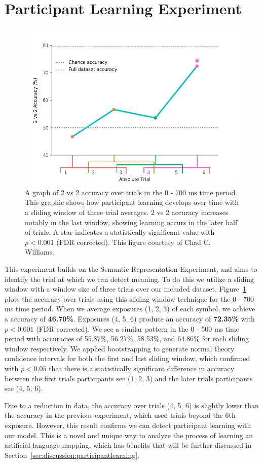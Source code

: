 \section{Participant Learning Experiment}
\label{sec:results:participantlearning}

\begin{figure}[!b]
  \centering
  \includegraphics[width=0.75\linewidth]{figures/learning}
  \caption[\tvt Accuracy over Trials]{
    A graph of 2 vs 2 accuracy over trials in the 0 - 700 ms time period. This 
    graphic shows how participant learning develops over time with a sliding 
    window of three trial averages.  2 vs 2 accuracy increases notably in the 
    last window, showing learning occurs in the later half of trials. A star 
    indicates a statistically significant value with $p < 0.001$ (FDR 
    corrected). This figure courtesy of Chad C. Williams.
  }
  \label{fig:learning}
\end{figure}

This experiment builds on the Semantic Representation Experiment, and aims to 
identify the trial at which we can detect meaning. To do this we utilize a 
sliding window with a window size of three trials over our included dataset.   
Figure~\ref{fig:learning} plots the \tvt accuracy over trials using this 
sliding window technique for the 0 - 700 ms time period. When we average 
exposures (1, 2, 3) of each symbol, we achieve a \tvt accuracy of 
\textbf{46.70\%}.  Exposures (4, 5, 6) produce an accuracy of \textbf{72.35\%} 
with $p < 0.001$ (FDR corrected). We see a similar pattern in the 0 - 500 ms 
time period with accuracies of 55.87\%, 56.27\%, 58.53\%, and 64.86\% for each 
sliding window respectively. We applied bootstrapping to generate normal theory 
confidence intervals for both the first and last sliding window, which 
confirmed with $p < 0.05$ that there is a statistically significant difference 
in \tvt accuracy between the first trials participants see (1, 2, 3) and the 
later trials participants see (4, 5, 6).

Due to a reduction in data, the \tvt accuracy over trials (4, 5, 6) is slightly 
lower than the \tvt accuracy in the previous experiment, which used trials 
beyond the 6th exposure. However, this result confirms we can detect 
participant learning with our model. This is a novel and unique way to analyze 
the process of learning an artificial language mapping, which has benefits that 
will be further discussed in Section~\ref{sec:discussion:participantlearning}.
